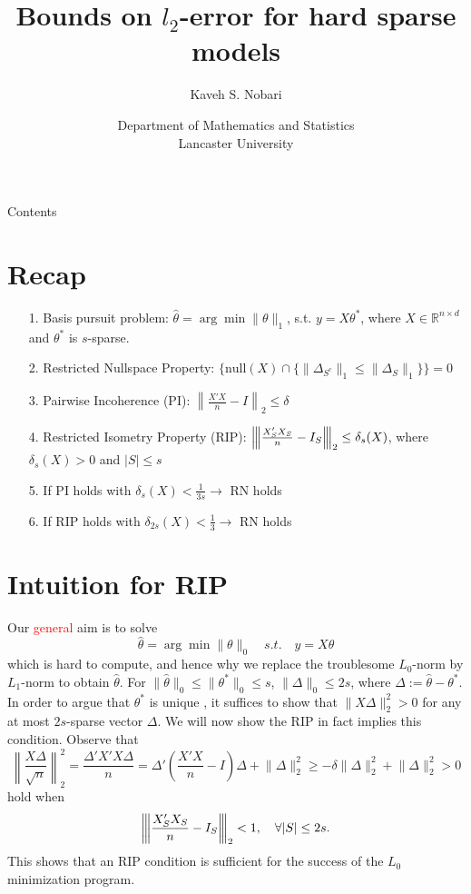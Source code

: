 \documentclass[10pt,handout,english]{beamer}
\title[]{Bounds on $l_2$-error for hard sparse models}
\author[Kaveh S. Nobari]{Kaveh S. Nobari}
\institute[]{Lectures in High-Dimensional Statistics}
\date[27/10/2020]
{Department of Mathematics and Statistics\\ Lancaster University}
\newcommand{\R}{\mathbb{R}}
\newcommand{\vertiii}[1]{{\left\vert\kern-0.25ex\left\vert\kern-0.25ex\left\vert #1 
    \right\vert\kern-0.25ex\right\vert\kern-0.25ex\right\vert}}
\begin{document}
\begin{frame}
\titlepage
\end{frame}


\begin{frame}{Contents}
\tableofcontents
\end{frame}

\section{Recap}

\begin{frame}[allowframebreaks]
\begin{itemize}
\setlength\itemsep{0.5em}
\item[1.] Basis pursuit problem: $\hat{\theta}=\arg \min \lVert \theta\rVert_1$, s.t. $y=X\theta^*$, where $X\in\R^{n\times d}$ and $\theta^*$ is $s$-sparse. \justifying
\item[2.] Restricted Nullspace Property: $\{\text{null}(X)\cap \{\lVert\Delta_{S^c}\rVert_1\leq \lVert\Delta_S\rVert_1\}\}=0$\justifying
\item[3.] Pairwise Incoherence (PI): $\left\lVert \frac{X'X}{n}-I \right\rVert_2\leq \delta$ \justifying
\item[4.] Restricted Isometry Property (RIP): $\vertiii{\frac{X_S'X_S}{n}- I_S}_2\leq \delta_s(X)$, where $\delta_s(X)>0$ and $\lvert S \rvert\leq s$\justifying
\item[5.] If PI holds with $\delta_s(X)<\frac{1}{3s} \rightarrow$ RN holds\justifying
\item[6.] If RIP holds with $\delta_{2s}(X)<\frac{1}{3}\rightarrow$ RN holds\justifying
\end{itemize}
\end{frame}

\section{Intuition for RIP}

\begin{frame}[allowframebreaks]
Our \textcolor{red}{general} aim is to solve 
\[
\hat{\theta}=\arg\min\lVert\theta\rVert_0\quad s.t.\quad y=X\theta
\]
which is hard to compute, and hence why we replace the troublesome $L_0$-norm by $L_1$-norm to obtain $\hat{\theta}$. For $\lVert\hat{\theta}\rVert_0\leq\lVert\theta^*\rVert_0\leq s$, $\lVert\Delta \rVert_0\leq 2s$, where $\Delta:=\hat{\theta}-\theta^*$.
\justifying
In order to argue that $\theta^*$ is unique , it suffices to show that $\lVert X\Delta \rVert_2^2>0$ for any at most $2s$-sparse vector $\Delta$.
\justifying
We will now show the RIP in fact implies this condition. Observe that
\[
\left\lVert\frac{X\Delta}{\sqrt{n}}\right\rVert_2^2=\frac{\Delta'X'X\Delta}{n}=\Delta'\left(\frac{X'X}{n}-I\right)\Delta+\lVert\Delta\rVert_2^2\geq -\delta\lVert\Delta\rVert_2^2+\lVert\Delta\rVert_2^2>0
\]
hold when 
\[
\vertiii{\frac{X'_SX_S}{n}- I_S}_2<1,\quad\forall \lvert S\rvert\leq 2s. 
\]
This shows that an RIP condition is sufficient for the success of the $L_0$ minimization program.
\end{frame}
\end{document}
